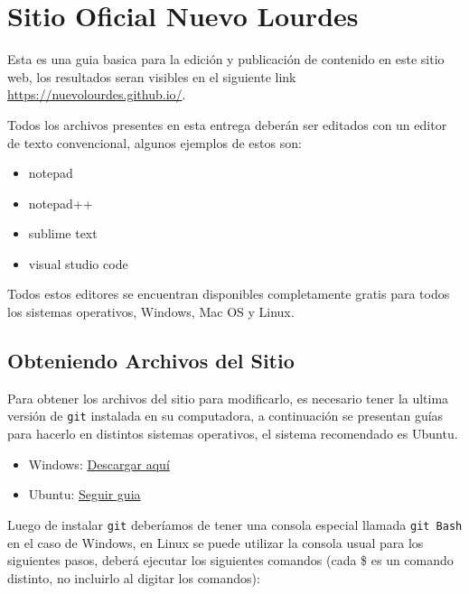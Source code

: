 \section{Sitio Oficial Nuevo Lourdes}

Esta es una guia basica para la edición y publicación de contenido en este sitio web, los resultados seran visibles en el siguiente link \url{https://nuevolourdes.github.io/}.

Todos los archivos presentes en esta entrega deberán ser editados con un editor de texto convencional, algunos ejemplos de estos son:

\begin{itemize}
  \item notepad
  \item notepad++
  \item sublime text
  \item visual studio code
\end{itemize}

Todos estos editores se encuentran disponibles completamente gratis para todos los sistemas operativos, Windows, Mac OS y Linux.

\subsection{Obteniendo Archivos del Sitio}

Para obtener los archivos del sitio para modificarlo, es necesario tener la ultima versión de \texttt{git} instalada en su computadora, a continuación se presentan guías para hacerlo en distintos sistemas operativos, el sistema recomendado es Ubuntu.

\begin{itemize}
\item Windows: \href{https://git-scm.com/download/win}{Descargar aquí}
\item Ubuntu: \href{https://git-scm.com/book/es/v1/Empezando-Instalando-Git\#Instalando-en-Linux}{Seguir guia}
\end{itemize}

Luego de instalar \texttt{git} deberíamos de tener una consola especial llamada \texttt{git Bash} en el caso de Windows, en Linux se puede utilizar la consola usual para los siguientes pasos, deberá ejecutar los siguientes comandos (cada \$ es un comando distinto, no incluirlo al digitar los comandos):


